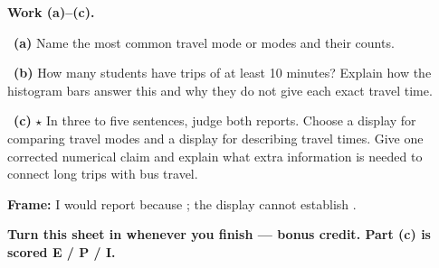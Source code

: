 \documentclass[11pt]{article}
\begin{document}
\newpage
\textbf{Work (a)--(c).}\par\smallskip

~\textbf{(a)} Name the most common travel mode or modes and their counts.\par
\workspace{0.6in}

~\textbf{(b)} How many students have trips of at least 10 minutes? Explain how the histogram bars answer this and why they do not give each exact travel time.\par
\workspace{1.3in}

~\textbf{(c)} $\star$ In three to five sentences, judge both reports. Choose a display for comparing travel modes and a display for describing travel times. Give one corrected numerical claim and explain what extra information is needed to connect long trips with bus travel.\par
\workspace{2.1in}

\begin{sentenceframebox}\raggedright\textbf{Frame:} I would report \blank[1.5in] because \blank[2.6in]; the display cannot establish \blank[2in].\end{sentenceframebox}

\textbf{Turn this sheet in whenever you finish --- bonus credit. Part (c) is scored E / P / I.}\par
\end{document}
